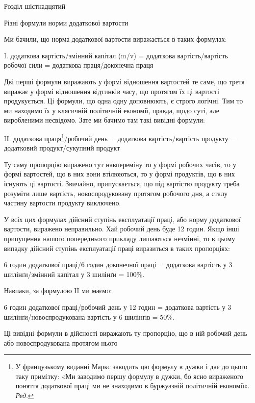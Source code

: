 Розділ шістнадцятий

Різні формули норми додаткової вартости

Ми бачили, що норма додаткової вартости виражається в таких
формулах:

I. додаткова вартість/змінний капітал (m/v) =
додаткова вартість/вартість робочої сили =
додаткова праця/доконечна праця

Дві перші формули виражають у формі відношення вартостей
те саме, що третя виражає у формі відношення відтинків часу,
що протягом їх ці вартості продукується. Ці формули, що одна
одну доповнюють, є строго логічні. Тим то ми находимо їх у клясичній
політичній економії, правда, щодо суті, але виробленими
несвідомо. Зате ми бачимо там такі вивідні формули:

II. додаткова праця\footnote*{
У французькому виданні Маркс заводить цю формулу в дужки
і дає до цього таку примітку: «Ми заводимо першу формулу в дужки,
бо ясно вираженого поняття додаткової праці ми не знаходимо в буржуазній
політичній економії». \emph{Ред.}
}/робочий день =
додаткова вартість/вартість продукту =
додатковий продукт/сукупний продукт

Ту саму пропорцію виражено тут навпереміну то у формі
робочих часів, то у формі вартостей, що в них вони втілюються,
то у формі продуктів, що в них існують ці вартості. Звичайно,
припускається, що під вартістю продукту треба розуміти лише
вартість, новоспродуковану протягом робочого дня, а сталу частину
вартости продукту виключено.

У всіх цих формулах дійсний ступінь експлуатації праці, або
норму додаткової вартости, виражено неправильно. Хай робочий
день буде 12 годин. Якщо інші припущення нашого попереднього
прикладу лишаються незмінні, то в цьому випадку дійсний
ступінь експлуатації праці виразиться в таких пропорціях:

6    годин додаткової праці/6 годин доконечної праці =
додаткова вартість у 3 шилінґи/змінний капітал у 3 шилінґи = 100\%.

Навпаки, за формулою II ми маємо:

6 годин додаткової праці/робочий день у 12 годин =
додаткова вартість у 3 шилінґи/новоспродукована вартість у 6 шилінґів =
50\%.

Ці вивідні формули в дійсності виражають ту пропорцію,
що в ній робочий день або новоспродукована протягом нього
\parbreak{}  %
